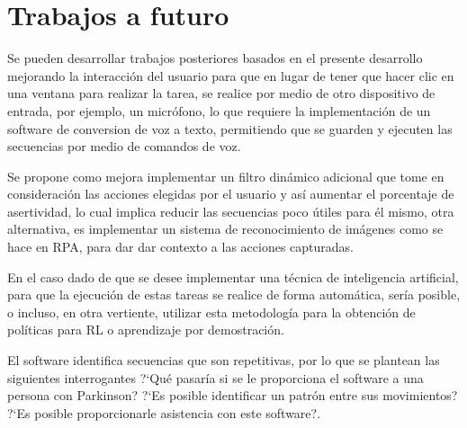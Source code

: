 \section{Trabajos a futuro}


Se pueden desarrollar trabajos posteriores basados en el presente desarrollo
 mejorando la interacci\'on del usuario para que en lugar de tener que hacer 
 clic en una ventana para realizar la tarea, se realice por medio de otro 
 dispositivo de entrada, por ejemplo, un micr\'ofono, lo que requiere la 
 implementaci\'on de un software de conversion de voz a texto, permitiendo que 
 se guarden y ejecuten las secuencias por medio de comandos de voz. 
 

Se propone como mejora implementar un filtro din\'amico adicional que tome en 
 consideraci\'on las acciones elegidas por el usuario y as\'i aumentar el 
 porcentaje de asertividad, lo cual implica reducir las secuencias poco
  \'utiles para \'el mismo, otra alternativa, es implementar un sistema de
 reconocimiento de im\'agenes como se hace en RPA, para dar dar contexto a las 
 acciones capturadas. 

 
En el caso dado de que se desee implementar una t\'ecnica de inteligencia  
 artificial, para que la ejecuci\'on de estas tareas se realice de forma 
 autom\'atica, ser\'ia posible, o incluso, en otra vertiente, utilizar esta 
 metodolog\'ia para la obtenci\'on de pol\'iticas para RL o aprendizaje por 
 demostraci\'on.


El software identifica secuencias que son repetitivas, por lo que se 
 plantean las siguientes interrogantes ?`Qu\'e pasar\'ia si se le 
 proporciona el software a una persona con Parkinson?  
 ?`Es posible identificar un patr\'on entre sus movimientos? 
 ?`Es posible proporcionarle asistencia con este software?.
